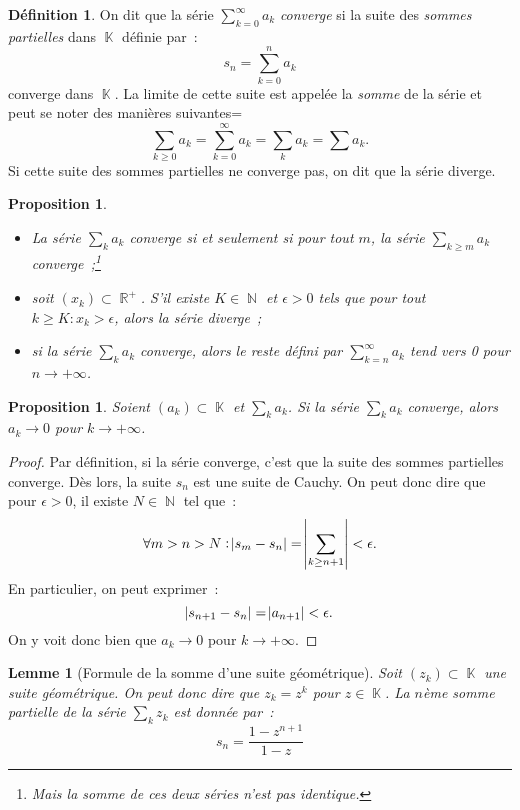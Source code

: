 \documentclass{article}
\DeclareMathOperator{\K}{\mathbb K}
\DeclareMathOperator{\N}{\mathbb N}
\DeclareMathOperator{\R}{\mathbb R}
\newcommand{\geomsum}[2]{\frac {1 - #1^{#2+1}}{1 - #1}}
\newtheorem{prp}[thm]{Proposition}
\newtheorem{lem}[thm]{Lemme}
\theoremstyle{definition}
\newtheorem{déf}[thm]{Définition}
\theoremstyle{remark}
\begin{document}
		\begin{déf} On dit que la série $\sum_{k=0}^\infty a_k$ \emph{converge} si la suite des \emph{sommes partielles} dans $\K$ définie par~:
		\[s_n = \sum_{k=0}^n a_k\]
		converge dans $\K$. La limite de cette suite est appelée la \emph{somme} de la série et peut se noter des manières suivantes=
		\[\sum_{k \geq 0} a_k = \sum_{k=0}^\infty a_k = \sum_k a_k = \sum a_k.\]
		Si cette suite des sommes partielles ne converge pas, on dit que la série diverge.
		\end{déf}

		\begin{prp}
		\begin{itemize}
			\item La série $\sum_k a_k$ converge si et seulement si pour tout $m$, la série $\sum_{k \geq m}a_k$ converge~;\footnote{Mais la somme de ces deux
			séries n'est pas identique.}
			\item soit $(x_k) \subset \R^+$. S'il existe $K \in \N$ et $\epsilon > 0$ tels que pour tout $k \geq K : x_k > \epsilon$, alors la série diverge~;
			\item si la série $\sum_k a_k$ converge, alors le \emph{reste} défini par $\sum_{k=n}^\infty a_k$ tend vers 0 pour $n \to +\infty$.
		\end{itemize}
		\end{prp}

		\begin{prp}\label{prp:siserieconvalorstermevers0} Soient $(a_k) \subset \K$ et $\sum_k a_k$. Si la série $\sum_k a_k$ converge, alors $a_k \to 0$ pour
		$k \to +\infty$.
		\end{prp}

		\begin{proof} Par définition, si la série converge, c'est que la suite des sommes partielles converge. Dès lors, la suite $s_n$ est une suite de Cauchy.
		On peut donc dire que pour $\epsilon > 0$, il existe $N \in \N$ tel que~:
		\[\forall m > n > N : \abs {s_m - s_n} = \abs {\sum_{k \geq n+1}} < \epsilon.\]
		En particulier, on peut exprimer~:
		\[\abs {s_{n+1} - s_n} = \abs {a_{n+1}} < \epsilon.\]
		On y voit donc bien que $a_k \to 0$ pour $k \to +\infty$.
		\end{proof}

		\begin{lem}[Formule de la somme d'une suite géométrique] Soit $(z_k) \subset \K$ une suite géométrique. On peut donc dire que $z_k = z^k$ pour
		$z \in \K$. La $n$ème somme partielle de la série $\sum_k z_k$ est donnée par~:
		\[s_n = \geomsum zn\]
		\end{lem}
\end{document}
